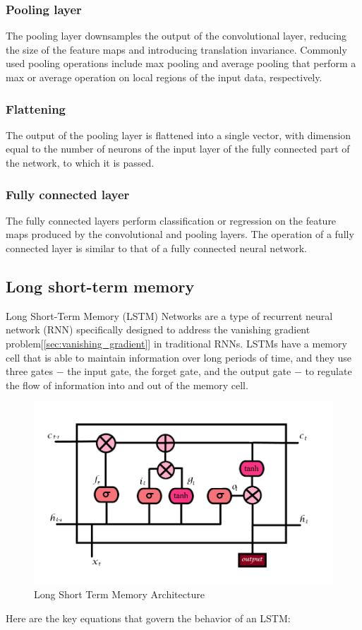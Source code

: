 \documentclass[a4paper]{sapthesis}
\begin{document}
\subsubsection{Pooling layer}
The pooling layer downsamples the output of the convolutional 
layer, reducing the size of the feature maps and introducing translation
 invariance. Commonly used pooling operations include max pooling and
average pooling that perform a max or average operation on local regions
 of the input data, respectively.
\subsubsection{Flattening}
The output of the pooling layer is flattened into a
 single vector, with dimension equal to the number of neurons of the
 input layer of the fully connected part of the network,
 to which it is passed.
\subsubsection{Fully connected layer}
The fully connected layers perform classification
 or regression on the feature maps produced by the convolutional and
  pooling layers. The operation of a fully connected layer is similar 
  to that of a fully connected neural network.
\subsection{Long short-term memory}
Long Short-Term Memory (LSTM) Networks are a type of recurrent neural 
network (RNN) specifically designed to address the vanishing 
gradient problem[\ref{sec:vanishing_gradient}] in traditional RNNs. LSTMs have a memory cell that is
 able to maintain information over long periods of time, and they use 
 three gates $-$ the input gate, the forget gate, and the output gate $-$
  to regulate the flow of information into and out of the memory cell.
  \begin{figure}[h]
    \includegraphics[scale=0.5]{lstm}
    \centering
    \caption{Long Short Term Memory Architecture}\label{fig:lstm}
    \end{figure} 
Here are the key equations that govern the behavior of an LSTM:
\end{document}
